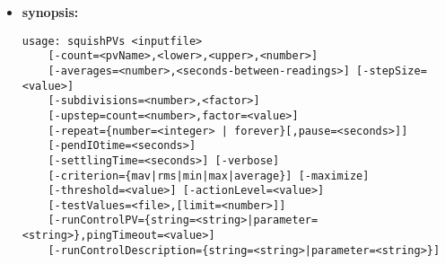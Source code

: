 \begin{itemize}
\item {\bf synopsis:} 
%
%
\begin{verbatim}
usage: squishPVs <inputfile>
    [-count=<pvName>,<lower>,<upper>,<number>]
    [-averages=<number>,<seconds-between-readings>] [-stepSize=<value>]
    [-subdivisions=<number>,<factor>]
    [-upstep=count=<number>,factor=<value>]
    [-repeat={number=<integer> | forever}[,pause=<seconds>]]
    [-pendIOtime=<seconds>]
    [-settlingTime=<seconds>] [-verbose]
    [-criterion={mav|rms|min|max|average}] [-maximize]
    [-threshold=<value>] [-actionLevel=<value>]
    [-testValues=<file>,[limit=<number>]]
    [-runControlPV={string=<string>|parameter=<string>},pingTimeout=<value>]
    [-runControlDescription={string=<string>|parameter=<string>}]
\end{verbatim}


\end{itemize}
